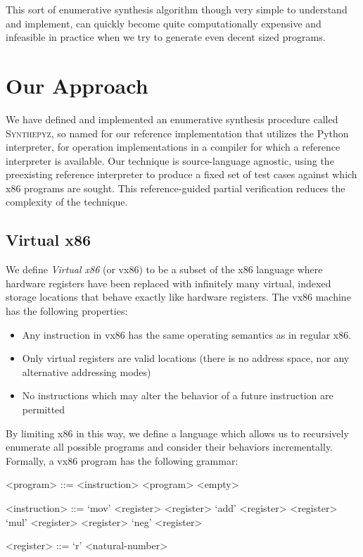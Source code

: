 \documentclass{article}
\begin{document}
This sort of enumerative synthesis algorithm though very simple to understand
and implement, can quickly become quite computationally expensive and
infeasible in practice when we try to generate even decent sized programs.

\section{Our Approach}
\label{sec:approach}

We have defined and implemented an enumerative synthesis procedure called
\textsc{Synthepyz}, so named for our reference implementation that utilizes the
Python interpreter, for operation implementations in a compiler for which a
reference interpreter is available.  Our technique is source-language agnostic,
using the preexisting reference interpreter to produce a fixed set of test
cases against which x86 programs are sought.  This reference-guided partial
verification reduces the complexity of the technique.

\subsection{Virtual x86}

We define \textit{Virtual x86} (or vx86) to be a subset of the x86 language
where hardware registers have been replaced with infinitely many virtual,
indexed storage locations that behave exactly like hardware registers.  The
vx86 machine has the following properties:

\begin{itemize}
    \item Any instruction in vx86 has the same operating semantics as in
	regular x86.
    \item Only virtual registers are valid locations (there is no address
	space, nor any alternative addressing modes)
    \item No instructions which may alter the behavior of a future instruction
	are permitted
\end{itemize}

By limiting x86 in this way, we define a language which allows us to
recursively enumerate all possible programs and consider their behaviors
incrementally. Formally, a vx86 program has the following grammar:

\begin{grammar}
<program> ::= <instruction> <program>
\alt <empty>

<instruction> ::= `mov' <register> <register>
\alt `add' <register> <register>
\alt `mul' <register> <register>
\alt `neg' <register>

<register> ::= `r' <natural-number>
\end{grammar}
\end{document}
